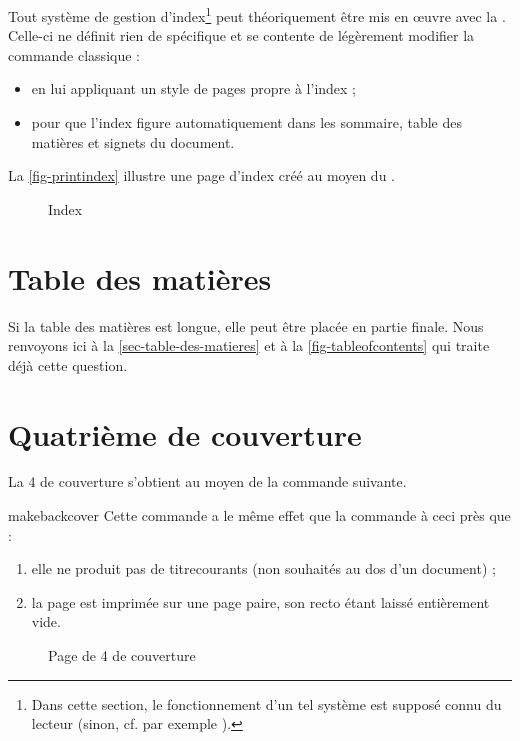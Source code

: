 Tout système de gestion d'index\footnote{Dans cette section, le fonctionnement
  d'un tel système est supposé connu du lecteur (sinon, cf. par exemple
  \cite{en-ligne7}).} peut théoriquement être mis en œuvre avec la
\yatCl. Celle-ci ne définit rien de spécifique et se contente de légèrement
modifier la commande  classique :
\begin{itemize}
\item en lui appliquant un style de pages propre à l'index ;
\item pour que l'index figure automatiquement dans les
  sommaire, table des matières et signets du document.
\end{itemize}

La \vref{fig-printindex} illustre une page d'index créé au moyen du
.

\begin{figure}[htbp]
  \centering
  \caption{Index}
  \label{fig-printindex}
\end{figure}

\section{Table des matières}
%

Si la table des matières est longue, elle peut être placée en partie
finale. Nous renvoyons ici à la \vref{sec-table-des-matieres} et à la
\vref{fig-tableofcontents} qui traite déjà cette question.

\section{Quatrième de couverture}\label{sec-quatr-de-couv}
%
%

La 4\ieme{} de couverture s'obtient au moyen de la commande
 suivante.

\begin{docCommand}{makebackcover}{}
  Cette commande a le même effet que la commande 
  à ceci près que :
  \begin{enumerate}
  \item elle ne produit pas de \glspl{titrecourant} (non souhaités au dos d'un
    document) ;
  \item la page est imprimée sur une page paire, son recto étant
    laissé entièrement vide.
  \end{enumerate}
\end{docCommand}

\begin{figure}[htbp]
  \centering
  \caption{Page de 4\ieme{} de couverture}
  \label{fig-makebackcover}
\end{figure}

